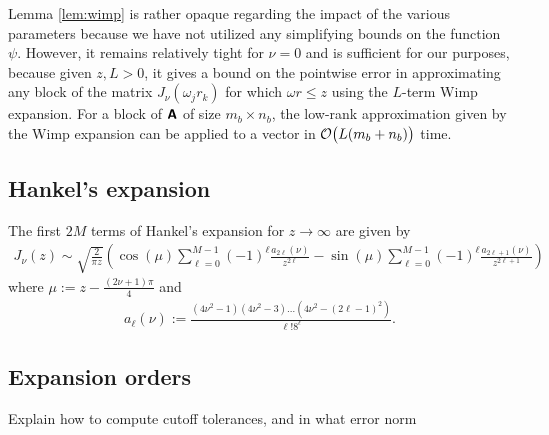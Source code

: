 Lemma \ref{lem:wimp} is rather opaque regarding the impact of the various
parameters because we have not utilized any simplifying bounds on the function
$\psi$. However, it remains relatively tight for $\nu = 0$ and is sufficient for
our purposes, because given $z, L > 0$, it gives a bound on the pointwise error
in approximating any block of the matrix $J_\nu(\omega_j r_k)$ for which $\omega
r \leq z$ using the $L$-term Wimp expansion. For a block of $\bm{\mathsf{A}}$ of size
$m_b \times n_b$, the low-rank approximation given by the Wimp expansion can be
applied to a vector in $\mathcal{O}\big(L(m_b + n_b)\big)$ time.

\subsection{Hankel's expansion}
\label{sec:asymptotic}

The first $2M$ terms of Hankel's expansion for $z \to \infty$ are given by
\begin{align} \label{eq:asymptotic-expansion}
    J_\nu(z)
    \sim \sqrt{\frac{2}{\pi z}} \left( 
        \cos\left(\mu\right) \sum_{\ell=0}^{M-1} (-1)^\ell \frac{a_{2\ell}(\nu)}{z^{2\ell}}
        - \sin\left(\mu\right) \sum_{\ell=0}^{M-1} (-1)^\ell \frac{a_{2\ell+1}(\nu)}{z^{2\ell+1}}
        \right)
\end{align}
where $\mu := z - \frac{(2\nu+1)\pi}{4}$ and 
\begin{align}
    a_\ell(\nu) := \frac{(4\nu^2 - 1)(4\nu^2 - 3)\dots(4\nu^2 - (2\ell-1)^2)}{\ell! 8^\ell}.
\end{align}







\subsection{Expansion orders}
\label{sec:cutoff}

Explain how to compute cutoff tolerances, and in what error norm



